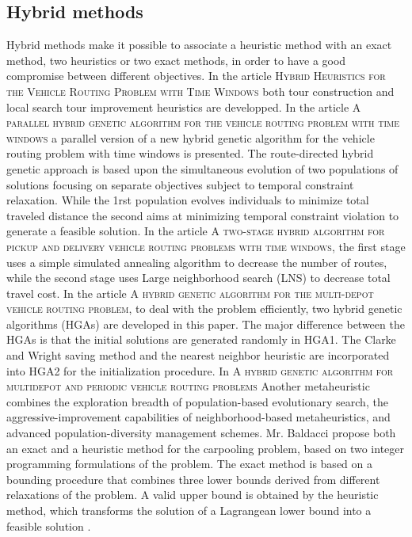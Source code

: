 \documentclass[12pt, a4paper,twoside]{memoir}
\newcommand{\newpar}{\vskip 0.2in \noindent}
\begin{document}
	\subsection{Hybrid methods}
	Hybrid methods make it possible to associate a heuristic method with an exact method, two heuristics or two exact methods, in order to have a good compromise between different objectives.
	\newpar
	In the article \textsc{Hybrid Heuristics for the Vehicle Routing Problem with Time Windows}\cite{russellhybrid1995} both tour construction and local search tour improvement heuristics are developped. In the article \textsc{A parallel hybrid genetic algorithm for the vehicle routing problem with time windows}\cite{bergerparallel2004} a parallel version of a new hybrid genetic algorithm for the vehicle routing problem with time windows is presented. The route-directed hybrid genetic approach is based upon the simultaneous evolution of two populations of solutions focusing on separate objectives subject to temporal constraint relaxation. While the 1rst population evolves individuals to minimize total traveled distance the second aims at minimizing temporal constraint violation to generate a feasible solution. In the article \textsc{A two-stage hybrid algorithm for pickup and delivery vehicle routing problems with time windows}\cite{benttwo-stage2006}, the first stage uses a simple simulated annealing algorithm to decrease the number of routes, while the second stage uses Large neighborhood search (LNS) to decrease total travel cost. In the article \textsc{A hybrid genetic algorithm for the multi-depot vehicle routing problem}\cite{hohybrid2008}, to deal with the problem efficiently, two hybrid genetic algorithms (HGAs) are developed in this paper. The major difference between the HGAs is that the initial solutions are generated randomly in HGA1. The Clarke and Wright saving method and the nearest neighbor heuristic are incorporated into HGA2 for the initialization procedure. In \textsc{A hybrid genetic algorithm for multidepot and periodic vehicle routing problems}\cite{vidalhybrid2012} Another metaheuristic combines the exploration breadth of population-based evolutionary search, the aggressive-improvement capabilities of neighborhood-based metaheuristics, and advanced population-diversity management schemes.
	\newpar
	Mr. Baldacci propose both an exact and a heuristic method for the carpooling problem, based on two integer programming formulations of the problem. The exact method is based on a bounding procedure that combines three lower bounds derived from different relaxations of the problem. A valid upper bound is obtained by the heuristic method, which transforms the solution of a Lagrangean lower bound into a feasible solution \cite{baldacciexact2004}.
\end{document}
